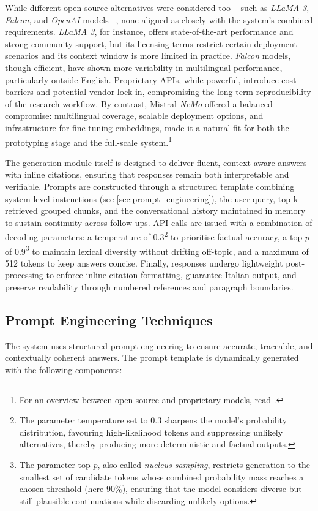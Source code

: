 \begin{spacing}{1.5}
While different open-source alternatives were considered too -- such as \textit{LLaMA 3}, \textit{Falcon}, and \textit{OpenAI} models --, none aligned as closely with the system’s combined requirements. \textit{LLaMA 3}, for instance, offers state-of-the-art performance and strong community support, but its licensing terms restrict certain deployment scenarios and its context window is more limited in practice. \textit{Falcon} models, though efficient, have shown more variability in multilingual performance, particularly outside English. Proprietary APIs, while powerful, introduce cost barriers and potential vendor lock-in, compromising the long-term reproducibility of the research workflow. By contrast, Mistral \textit{NeMo} offered a balanced compromise: multilingual coverage, scalable deployment options, and infrastructure for fine-tuning embeddings, made it a natural fit for both the prototyping stage and the full-scale system.\footnote{For an overview between open-source and proprietary models, read \textcite{noauthor_open_2025}.}


The generation module itself is designed to deliver fluent, context-aware answers with inline citations, ensuring that responses remain both interpretable and verifiable. Prompts are constructed through a structured template combining system-level instructions (see \autoref{sec:prompt_engineering}), the user query, top-k retrieved grouped chunks, and the conversational history maintained in memory to sustain continuity across follow-ups. API calls are issued with a combination of decoding parameters: a temperature of 0.3\footnote{The parameter temperature set to 0.3 sharpens the model’s probability distribution, favouring high-likelihood tokens and suppressing unlikely alternatives, thereby producing more deterministic and factual outputs.} to prioritise factual accuracy, a top-$p$ of 0.9\footnote{The parameter top-$p$, also called \textit{nucleus sampling}, restricts generation to the smallest set of candidate tokens whose combined probability mass reaches a chosen threshold (here 90\%), ensuring that the model considers diverse but still plausible continuations while discarding unlikely options.} to maintain lexical diversity without drifting off-topic, and a maximum of 512 tokens to keep answers concise. Finally, responses undergo lightweight post-processing to enforce inline citation formatting, guarantee Italian output, and preserve readability through numbered references and paragraph boundaries.


\subsection{Prompt Engineering Techniques} \label{sec:prompt_engineering}
The system uses structured prompt engineering to ensure accurate, traceable, and contextually coherent answers. The prompt template is dynamically generated with the following components:


\end{spacing}
